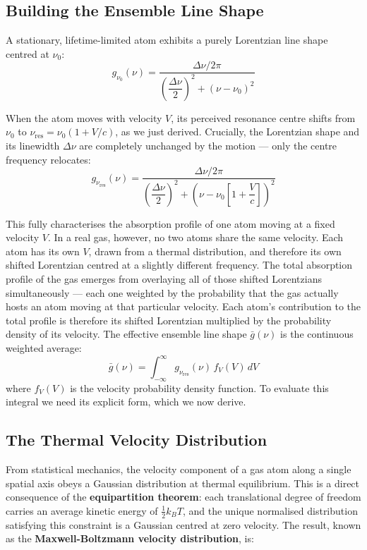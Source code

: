 \subsection{Building the Ensemble Line Shape}

A stationary, lifetime-limited atom exhibits a purely Lorentzian line shape centred at $\nu_0$:
\begin{equation*}
    g_{\nu_0}(\nu) = \frac{\Delta\nu/2\pi}{\left(\dfrac{\Delta\nu}{2}\right)^2 + \left(\nu - \nu_0\right)^2}
\end{equation*}

When the atom moves with velocity $V$, its perceived resonance centre shifts from $\nu_0$ to $\nu_{\text{res}} = \nu_0(1 + V/c)$, as we just derived. Crucially, the Lorentzian shape and its linewidth $\Delta\nu$ are completely unchanged by the motion — only the centre frequency relocates:
\begin{equation*}
    g_{\nu_{\text{res}}}(\nu) = \frac{\Delta\nu/2\pi}{\left(\dfrac{\Delta\nu}{2}\right)^2 + \left(\nu - \nu_0\!\left[1 + \dfrac{V}{c}\right]\right)^2}
\end{equation*}

This fully characterises the absorption profile of one atom moving at a fixed velocity $V$. In a real gas, however, no two atoms share the same velocity. Each atom has its own $V$, drawn from a thermal distribution, and therefore its own shifted Lorentzian centred at a slightly different frequency. The total absorption profile of the gas emerges from overlaying all of those shifted Lorentzians simultaneously — each one weighted by the probability that the gas actually hosts an atom moving at that particular velocity. Each atom's contribution to the total profile is therefore its shifted Lorentzian multiplied by the probability density of its velocity. The effective ensemble line shape $\bar{g}(\nu)$ is the continuous weighted average:
\begin{equation*}
    \bar{g}(\nu) = \int_{-\infty}^{\infty} g_{\nu_{\text{res}}}(\nu)\,f_V(V)\,dV
\end{equation*}
where $f_V(V)$ is the velocity probability density function. To evaluate this integral we need its explicit form, which we now derive.

\subsection{The Thermal Velocity Distribution}

From statistical mechanics, the velocity component of a gas atom along a single spatial axis obeys a Gaussian distribution at thermal equilibrium. This is a direct consequence of the \textbf{equipartition theorem}: each translational degree of freedom carries an average kinetic energy of $\frac{1}{2}k_BT$, and the unique normalised distribution satisfying this constraint is a Gaussian centred at zero velocity. The result, known as the \textbf{Maxwell-Boltzmann velocity distribution}, is:


